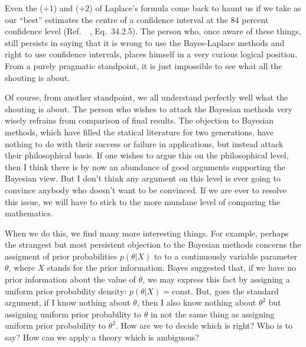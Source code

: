 \documentclass[12pt]{article}
\let\oldcite\cite
\renewcommand{\cite}{~\oldcite}
\begin{document}
Even the ($+1$) and ($+2$) of Laplace's formula come back to haunt us if we take as our ``best'' estimates the centre of a confidence interval at the 84 percent confidence level (Ref.~\cite{cramer}, Eq.~34.2.5). The person who, once aware of these things, still persists in saying that it is wrong to use the Bayes-Laplace methods and right to use confidence intervals, places himself in a very curious logical position. From a purely pragmatic standpoint, it is just impossible to see what all the shouting is about.

Of course, from another standpoint, we all understand perfectly well what the shouting is about. The person who wishes to attack the Bayesian methods very wisely refrains from comparison of final results. The objection to Bayesian methods, which have filled the statical literature for two generations, have nothing to do with their success or failure in applications, but instead attack their philosophical basis. If one wishes to argue this on the philosophical level, then I think there is by now an abundance of good arguments supporting the Bayesian view. But I don't think any argument on this level is ever
going to convince anybody who doesn't want to be convinced. If we are
ever to resolve this issue, we will have to stick to the more mundane level of comparing the mathematics.

When we do this, we find many more interesting things. For
example, perhaps the strangest but most persistent objection to the
Bayesian methods concerns the assigment of prior probabilities $p(\theta|X)$ to
to a continuously variable parameter $\theta$, where $X$ stands for the prior
information. Bayes suggested that, if we have no prior information
about the value of $\theta$, we may express this fact by assigning a uniform
prior probability density: $p(\theta|X) = \text{const.}$ But, goes the standard
argument, if I know nothing about $\theta$, then I also know nothing about $\theta^2$
but assigning uniform prior probability to $\theta$ in not the same thing as
assigning uniform prior probability to $\theta^2$. How are we to decide which
is right? Who is to say? How can we apply a theory which is ambiguous?
\end{document}
